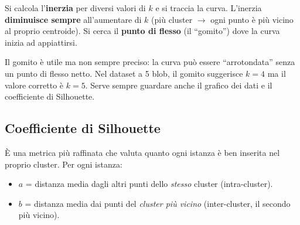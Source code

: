 Si calcola l'\textbf{inerzia} per diversi valori di $k$ e si traccia la curva. L'inerzia \textbf{diminuisce sempre} all'aumentare di $k$ (più cluster $\to$ ogni punto è più vicino al proprio centroide). Si cerca il \textbf{punto di flesso} (il ``gomito'') dove la curva inizia ad appiattirsi.

\begin{center}
\end{center}

\begin{warnbox}
Il gomito è utile ma non sempre preciso: la curva può essere ``arrotondata'' senza un punto di flesso netto. Nel dataset a 5 blob, il gomito suggerisce $k=4$ ma il valore corretto è $k=5$. Serve sempre guardare anche il grafico dei dati e il coefficiente di Silhouette.
\end{warnbox}

\subsection{Coefficiente di Silhouette}

È una metrica più raffinata che valuta quanto ogni istanza è ben inserita nel proprio cluster. Per ogni istanza:
\begin{itemize}
    \item $a$ = distanza media dagli altri punti dello \emph{stesso} cluster (intra-cluster).
    \item $b$ = distanza media dai punti del \emph{cluster più vicino} (inter-cluster, il secondo più vicino).
\end{itemize}

